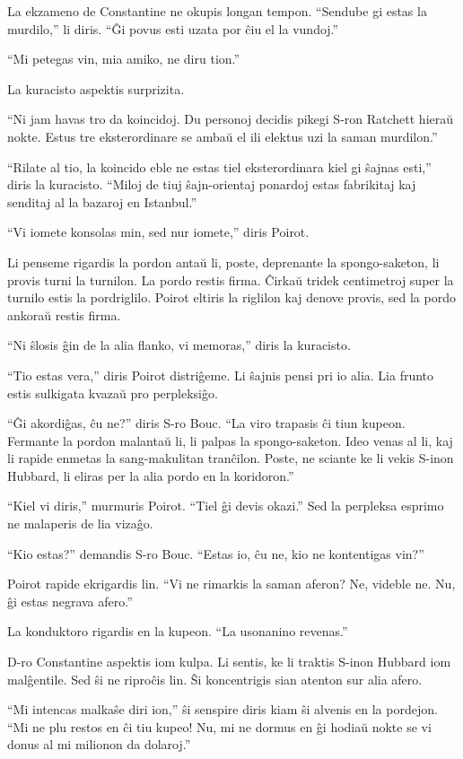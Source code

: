 La ekzameno de Constantine ne okupis longan tempon. ``Sendube gi estas la murdilo,'' li diris. ``Ĝi povus esti uzata por ĉiu el la vundoj.''

``Mi petegas vin, mia amiko, ne diru tion.''

La kuracisto aspektis surprizita.

``Ni jam havas tro da koincidoj. Du personoj decidis pikegi S-ron Ratchett hieraŭ nokte. Estus tre eksterordinare se ambaŭ el ili elektus uzi la saman murdilon.''

``Rilate al tio, la koincido eble ne estas tiel eksterordinara kiel gi ŝajnas esti,'' diris la kuracisto. ``Miloj de tiuj ŝajn-orientaj ponardoj estas fabrikitaj kaj senditaj al la bazaroj en Istanbul.''

``Vi iomete konsolas min, sed nur iomete,'' diris Poirot.

Li penseme rigardis la pordon antaŭ li, poste, deprenante la spongo-saketon, li provis turni la turnilon. La pordo restis firma. Ĉirkaŭ tridek centimetroj super la turnilo estis la pordriglilo. Poirot eltiris la riglilon kaj denove provis, sed la pordo ankoraŭ restis firma.

``Ni ŝlosis ĝin de la alia flanko, vi memoras,'' diris la kuracisto.

``Tio estas vera,'' diris Poirot distriĝeme. Li ŝajnis pensi pri io alia. Lia frunto estis sulkigata kvazaŭ pro perpleksiĝo.

``Ĝi akordiĝas, ĉu ne?'' diris S-ro Bouc. ``La viro trapasis ĉi tiun kupeon. Fermante la pordon malantaŭ li, li palpas la spongo-saketon. Ideo venas al li, kaj li rapide enmetas la sang-makulitan tranĉilon. Poste, ne sciante ke li vekis S-inon Hubbard, li eliras per la alia pordo en la koridoron.''

``Kiel vi diris,'' murmuris Poirot. ``Tiel ĝi devis okazi.'' Sed la perpleksa esprimo ne malaperis de lia vizaĝo.

``Kio estas?'' demandis S-ro Bouc. ``Estas io, ĉu ne, kio ne kontentigas vin?''

Poirot rapide ekrigardis lin. ``Vi ne rimarkis la saman aferon? Ne, videble ne. Nu, ĝi estas negrava afero.''

La konduktoro rigardis en la kupeon. ``La usonanino revenas.''

D-ro Constantine aspektis iom kulpa. Li sentis, ke li traktis S-inon Hubbard iom malĝentile. Sed ŝi ne riproĉis lin. Ŝi koncentrigis sian atenton sur alia afero.

``Mi intencas malkaŝe diri ion,'' ŝi senspire diris kiam ŝi alvenis en la pordejon. ``Mi ne plu restos en ĉi tiu kupeo! Nu, mi ne dormus en ĝi hodiaŭ nokte se vi donus al mi milionon da dolaroj.''

